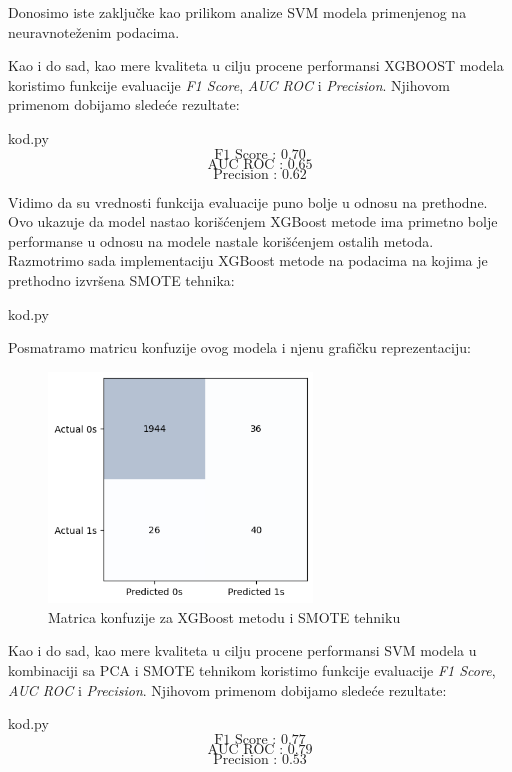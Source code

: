 \documentclass[12pt]{article}
\theoremstyle{definition}
\theoremstyle{remark}
\begin{document}
Donosimo iste zaključke kao prilikom analize SVM modela primenjenog na neuravnoteženim podacima.

Kao i do sad, kao mere kvaliteta u cilju procene performansi XGBOOST modela koristimo funkcije evaluacije  \emph{F1 Score}, \emph{AUC ROC} i \emph{Precision}. Njihovom primenom dobijamo sledeće rezultate:


\hfill

{kod.py}
$$
\text{F1 Score : 0.70}
$$
$$
\text{AUC ROC : 0.65}
$$
$$
\text{Precision : 0.62}
$$
\hfill

Vidimo da su vrednosti funkcija evaluacije puno bolje u odnosu na prethodne. Ovo ukazuje da model nastao korišćenjem XGBoost metode ima primetno bolje performanse u odnosu na modele nastale korišćenjem ostalih metoda. \\

Razmotrimo sada implementaciju XGBoost metode na podacima na kojima je prethodno izvršena SMOTE tehnika:

\hfill

{kod.py}

\hfill

Posmatramo matricu konfuzije ovog modela i njenu grafičku reprezentaciju:

\begin{figure}[htp]
    \centering
    \includegraphics[width=7cm]{output_96_0.png}
    \caption{Matrica konfuzije za XGBoost metodu i SMOTE tehniku}
    \label{fig:galaxy}
\end{figure}

Kao i do sad, kao mere kvaliteta u cilju procene performansi SVM modela u kombinaciji sa PCA i SMOTE tehnikom koristimo funkcije evaluacije  \emph{F1 Score}, \emph{AUC ROC} i \emph{Precision}. Njihovom primenom dobijamo sledeće rezultate:

\hfill

{kod.py}
$$
\text{F1 Score : 0.77}
$$
$$
\text{AUC ROC : 0.79}
$$
$$
\text{Precision : 0.53}
$$
\end{document}
